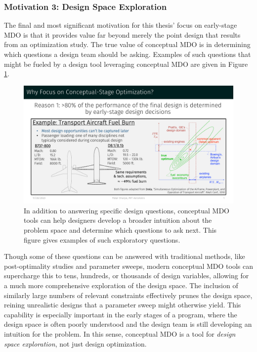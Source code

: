 
\subsubsection*{Motivation 3: Design Space Exploration}

The final and most significant motivation for this thesis' focus on early-stage MDO is that it provides value far beyond merely the point design that results from an optimization study. The true value of conceptual MDO is in determining which questions a design team should be asking. Examples of such questions that might be fueled by a design tool leveraging conceptual MDO are given in Figure \ref{fig:motivation_3}.

\begin{figure}[H]
    \centering
    \includegraphics[page=5,trim=0cm 3cm 0cm 6.2cm, clip, width=\textwidth]{../figures/motivation_for_conceptual_MDO_focus.pdf}
    \caption{In addition to answering specific design questions, conceptual MDO tools can help designers develop a broader intuition about the problem space and determine which questions to ask next. This figure gives examples of such exploratory questions.}
    \label{fig:motivation_3}
\end{figure}

Though some of these questions can be answered with traditional methods, like post-optimality studies and parameter sweeps, modern conceptual MDO tools can supercharge this to tens, hundreds, or thousands of design variables, allowing for a much more comprehensive exploration of the design space. The inclusion of similarly large numbers of relevant constraints effectively prunes the design space, reining unrealistic designs that a parameter sweep might otherwise yield. This capability is especially important in the early stages of a program, where the design space is often poorly understood and the design team is still developing an intuition for the problem. In this sense, conceptual MDO is a tool for \textit{design space exploration}, not just design optimization.
